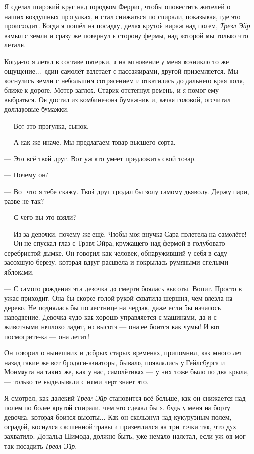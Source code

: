 Я сделал широкий круг над городком Феррис, чтобы оповестить жителей о наших воздушных прогулках,
и стал снижаться по спирали, показывая, где это происходит. Когда я пошёл на посадку, делая крутой
вираж над полем, {\it Тревл Эйр\/} взмыл с земли и сразу же повернул в сторону фермы, над которой мы только что летали.

Когда-то я летал в составе пятерки, и на мгновение у меня возникло то же ощущение...\ один самолёт взлетает с пассажирами, другой приземляется. Мы коснулись земли с небольшим сотрясением и откатились до дальнего края поля, ближе к дороге. Мотор заглох. Старик отстегнул ремень, и я помог ему выбраться. Он достал из комбинезона бумажник и, качая головой, отсчитал долларовые бумажки.

--- Вот это прогулка, сынок.

--- А как же иначе. Мы предлагаем товар высшего сорта.

--- Это всё твой друг. Вот уж кто умеет предложить свой товар.

--- Почему он?

--- Вот что я тебе скажу. Твой друг продал бы золу самому дьяволу. Держу пари, разве не так?

--- С чего вы это взяли?

--- Из-за девочки, почему же ещё. Чтобы моя внучка Сара полетела на самолёте! --- Он не спускал глаз с Трэвл Эйра, кружащего над фермой в голубовато-серебристой дымке. Он говорил как человек, обнаруживший у себя в саду засохшую березу, которая вдруг расцвела и покрылась румяными спелыми яблоками.

--- С самого рождения эта девочка до смерти боялась высоты. Вопит. Просто в ужас приходит. Она бы скорее голой рукой схватила шершня, чем влезла на дерево. Не поднялась бы по лестнице на чердак, даже если бы началось наводнение. Девочка чудо как хорошо управляется с машинами, да и с животными неплохо ладит, но высота --- она ее боится как чумы! И вот посмотрите-ка --- она летит!

Он говорил о нынешних и добрых старых временах, припомнил, как много лет назад такие же вот бродяги-авиаторы, бывало, появлялись у Гейлсбурга и Монмаута на таких же, как у нас, самолётиках --- у них тоже было по два крыла, --- только те выделывали с ними черт знает что.

Я смотрел, как далекий {\it Тревл Эйр\/} становится всё больше, как он снижается над полем по
более крутой спирали, чем это сделал бы я, будь у меня на борту девочка, которая боится высоты...
Как он скользнул над кукурузным полем, оградой, коснулся скошенной травы и приземлился на три
точки так, что дух захватило. Дональд Шимода, должно быть, уже немало налетал, если уж он мог так
посадить {\it Тревл Эйр}.

